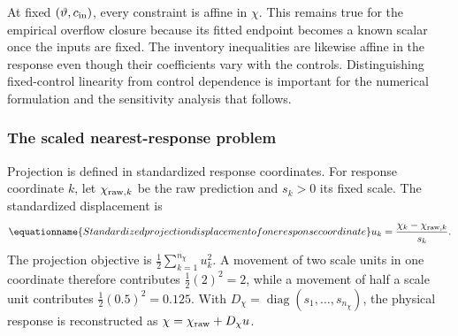 At fixed $(\vartheta,c_{\rm in})$, every constraint is affine in $\chi$. This remains true for the empirical overflow closure because its fitted endpoint becomes a known scalar once the inputs are fixed. The inventory inequalities are likewise affine in the response even though their coefficients vary with the controls. Distinguishing fixed-control linearity from control dependence is important for the numerical formulation and the sensitivity analysis that follows.

\subsubsection{The scaled nearest-response problem}

Projection is defined in standardized response coordinates. For response coordinate $k$, let $\chi_{{\rm raw},k}$ be the raw prediction and $s_k>0$ its fixed scale. The standardized displacement is
\begin{equation}
\equationname{Standardized projection displacement of one response coordinate}
u_k=\frac{\chi_k-\chi_{{\rm raw},k}}{s_k}.
\end{equation}
The projection objective is $\tfrac12\sum_{k=1}^{n_\chi}u_k^2$. A movement of two scale units in one coordinate therefore contributes $\tfrac12(2)^2=2$, while a movement of half a scale unit contributes $\tfrac12(0.5)^2=0.125$. With $D_\chi=\operatorname{diag}(s_1,\ldots,s_{n_\chi})$, the physical response is reconstructed as $\chi=\chi_{\rm raw}+D_\chi u$.

